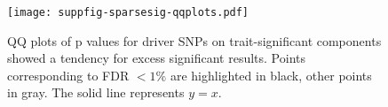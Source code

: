 \documentclass[11pt]{article}
\begin{document}

\begin{figure}
  \centering
  \texttt{[image: suppfig-sparsesig-qqplots.pdf]}
  \caption{QQ plots of p values for driver SNPs on trait-significant components showed a tendency for excess significant results. Points corresponding to FDR $< 1\%$ are highlighted in black, other points in gray. The solid line represents $y=x$.}
  \label{sfig:4}
\end{figure}
\end{document}
